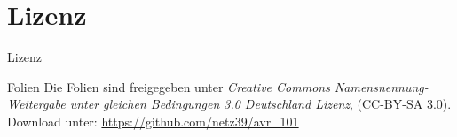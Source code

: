 \documentclass{beamer}
\begin{document}
\appendix

\section{Lizenz}

\begin{frame}{Lizenz}
    \begin{block}{Folien}
        Die Folien sind freigegeben unter \emph{Creative Commons
        Namensnennung-Weitergabe unter gleichen Bedingungen 3.0
        Deutschland Lizenz}, (CC-BY-SA 3.0). Download unter:
        \url{https://github.com/netz39/avr_101}
    \end{block}
\end{frame}
\end{document}
